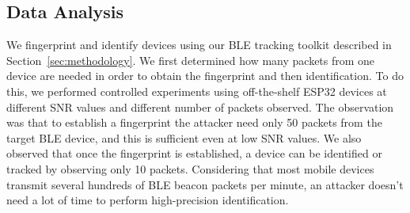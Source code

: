 

\subsection*{Data Analysis}
 
We fingerprint and identify devices using our BLE tracking toolkit
described in Section~\ref{sec:methodology}.
%
We first determined how many packets from one device are needed in order to obtain the fingerprint and then identification.
%
To do this, we performed controlled experiments using off-the-shelf ESP32 devices at different SNR values and different number of packets observed.
%
The observation was that to establish a fingerprint the attacker need only 50 packets from the target BLE device, and this is sufficient even at low SNR values.
%
We also observed that once the fingerprint is established, a device can be identified or tracked by observing only 10 packets.
%
Considering that most mobile devices transmit several hundreds of BLE beacon packets per minute, an attacker doesn't need a lot of time to perform high-precision identification.

